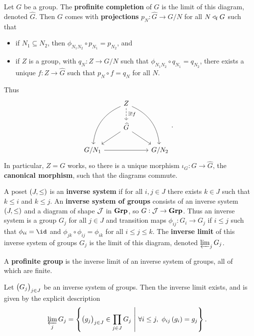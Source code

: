 \begin{definition}
Let $ G $ be a group. The \textbf{profinite completion} of $ G $ is the limit of this diagram, denoted $ \widehat{G} $. Then $ G $ comes with \textbf{projections} $ p_N : \widehat{G} \to G / N $ for all $ N \triangleleft_{\mathrm{f}} G $ such that
\begin{itemize}
\item if $ N_1 \subseteq N_2 $, then $ \phi_{N_1N_2} \circ p_{N_1} = p_{N_2} $, and
\item if $ Z $ is a group, with $ q_N : Z \to G / N $ such that $ \phi_{N_1N_2} \circ q_{N_1} = q_{N_2} $, there exists a unique $ f : Z \to \widehat{G} $ such that $ p_N \circ f = q_N $ for all $ N $.
\end{itemize}
Thus
$$
\begin{tikzcd}
& Z \arrow[dashed]{d}{\exists !f} \arrow[bend right=30]{ddl} \arrow[bend left=30]{ddr} & \\
& \widehat{G} \arrow{dl} \arrow{dr} & \\
G / N_1 \arrow{rr} & & G / N_2
\end{tikzcd}.
$$
In particular, $ Z = G $ works, so there is a unique morphism $ \iota_G : G \to \widehat{G} $, the \textbf{canonical morphism}, such that the diagrams commute.
\end{definition}

\begin{definition}
A poset $ \br{J, \le} $ is an \textbf{inverse system} if for all $ i, j \in J $ there exists $ k \in J $ such that $ k \le i $ and $ k \le j $. An \textbf{inverse system of groups} consists of an inverse system $ \br{J, \le} $ and a diagram of shape $ \mathcal{J} $ in $ \textbf{Grp} $, so $ G : \mathcal{J} \to \textbf{Grp} $. Thus an inverse system is a group $ G_j $ for all $ j \in J $ and transition maps $ \phi_{ij} : G_i \to G_j $ if $ i \le j $ such that $ \phi_{ii} = \id $ and $ \phi_{jk} \circ \phi_{ij} = \phi_{ik} $ for all $ i \le j \le k $. The \textbf{inverse limit} of this inverse system of groups $ G_j $ is the limit of this diagram, denoted $ \varprojlim_j G_j $.
\end{definition}

\begin{definition}
A \textbf{profinite group} is the inverse limit of an inverse system of groups, all of which are finite.
\end{definition}

\begin{proposition}
Let $ \br{G_j}_{j \in J} $ be an inverse system of groups. Then the inverse limit exists, and is given by the explicit description
$$ \varprojlim_j G_j = \cbr{\br{g_j}_{j \in J} \in \prod_{j \in J} G_j \st \forall i \le j, \ \phi_{ij}\br{g_i} = g_j}. $$
\end{proposition}

